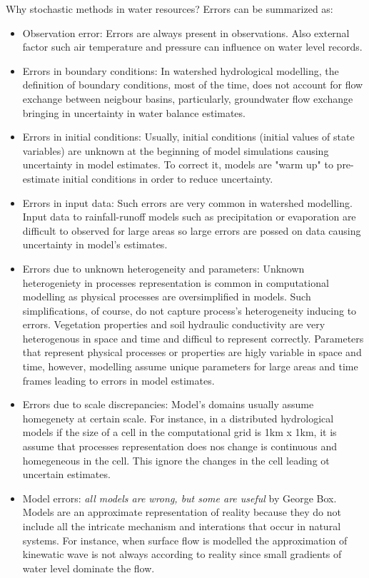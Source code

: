 \documentclass[8pt]{beamer}
\begin{document}
\begin{frame}{Why stochastic methods in water resources?}
    Errors  can be summarized as:
    \begin{itemize} 
        \small
        \item \alert{Observation error}: Errors are always present in observations. Also external factor such air temperature and pressure can influence on water level records.
        \item \alert{Errors in boundary conditions}: In watershed hydrological modelling, the definition of boundary conditions,  most of the time,  does not account for flow exchange between neigbour basins, particularly, groundwater flow exchange bringing in uncertainty in water balance estimates. 
        \item \alert{Errors in initial conditions}: Usually, initial conditions (initial values of state variables) are unknown at the beginning of model simulations causing uncertainty in model estimates. To correct it, models are "warm up" to pre-estimate initial conditions in order to reduce uncertainty.
        \item \alert{Errors in input data}: Such errors are very common in watershed modelling. Input data to rainfall-runoff models such as precipitation or evaporation are difficult to observed for large areas so large errors are possed on data causing uncertainty in model's estimates.  
        \item \alert{Errors due to unknown heterogeneity and parameters}: Unknown heterogeniety in processes representation is common in computational modelling as physical processes are oversimplified in models. Such simplifications, of course, do not capture process's heterogeneity inducing to errors. Vegetation properties and soil hydraulic conductivity are very heterogenous in space and time and difficul to represent correctly. Parameters that represent physical processes or properties are higly variable in space and time, however, modelling assume unique parameters for large areas and time frames leading to errors in model estimates. 
        \item \alert{Errors due to scale discrepancies}: Model's domains usually assume homegenety at certain scale. For instance, in a distributed hydrological models if the size of a cell in the computational grid is 1km x 1km, it is assume that processes representation does nos change is continuous and homegeneous in the cell. This ignore the changes in the cell leading ot uncertain estimates. 
        \item \alert{Model errors}: \emph{all models are wrong, but some are useful} by George Box. Models are an approximate representation of reality because they do not include all the intricate mechanism and interations that occur in natural systems. For instance, when surface flow is modelled the approximation of kinewatic wave is not always according to reality since small gradients of water level dominate the flow. 
    \end{itemize} 
\end{frame}
\end{document}
